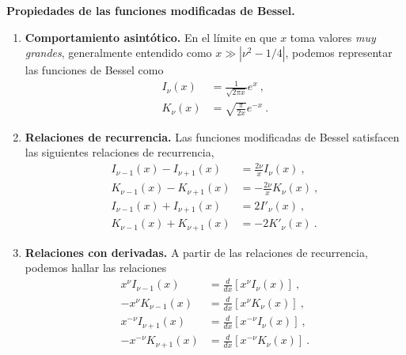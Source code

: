 \begin{propiedad}
    \textbf{Propiedades de las funciones modificadas de Bessel.}

    \begin{enumerate}
        \item \textbf{Comportamiento asintótico.} En el límite en que $x$ toma valores \emph{muy grandes}, generalmente entendido como $x \gg |\nu^2 - 1/4|$, podemos representar las funciones de Bessel como
        \begin{align}
            I_\nu(x) & = \frac{1}{\sqrt{2\pi x}} e^x \ , \\
            K_\nu(x) & = \sqrt{\frac{\pi}{2x}} e^{-x} \ . 
        \end{align}
        \item \textbf{Relaciones de recurrencia.} Las funciones modificadas de Bessel satisfacen las siguientes relaciones de recurrencia,
        \begin{align}
            I_{\nu - 1}(x) - I_{\nu + 1}(x) & =   \frac{2\nu}{x} I_\nu(x) \ , \\
            K_{\nu - 1}(x) - K_{\nu + 1}(x) & = - \frac{2\nu}{x} K_\nu(x) \ , \\
            I_{\nu - 1}(x) + I_{\nu + 1}(x) & =   2 I'_\nu(x) \ , \\
            K_{\nu - 1}(x) + K_{\nu + 1}(x) & = - 2 K'_\nu(x) \ .
        \end{align}
        \item \textbf{Relaciones con derivadas.} A partir de las relaciones de recurrencia, podemos hallar las relaciones
        \begin{align}
            x^{\nu} I_{\nu - 1}(x)    & = \frac{d}{dx}[x^\nu    I_\nu(x)] \ , \\
            - x^{\nu} K_{\nu - 1}(x)  & = \frac{d}{dx}[x^\nu    K_\nu(x)] \ , \\
            x^{-\nu} I_{\nu + 1}(x)   & = \frac{d}{dx}[x^{-\nu} I_\nu(x)] \ , \\
            - x^{-\nu} K_{\nu + 1}(x) & = \frac{d}{dx}[x^{-\nu} K_\nu(x)] \ .
        \end{align}
    \end{enumerate}
\end{propiedad}

